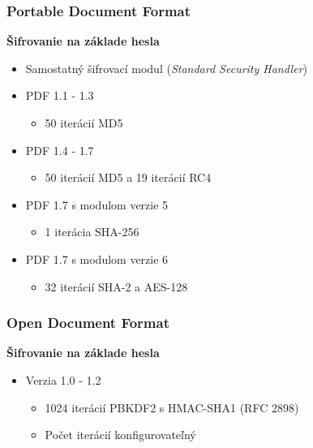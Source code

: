\documentclass[xcolor=dvipsnames]{beamer}
\def\itemtitle#1{{\bfseries#1\smallskip}}
\begin{document}
\begin{frame}
	\frametitle{Portable Document Format}
	\itemtitle{Šifrovanie na základe hesla}
	\begin{itemize}
		\item Samostatný šifrovací modul (\textit{Standard Security Handler}) 
		\item PDF 1.1 - 1.3
		\begin{itemize}
			\item 50 iterácií MD5
		\end{itemize}
		\item PDF 1.4 - 1.7
		\begin{itemize}
			\item 50 iterácií MD5 a 19 iterácií RC4
		\end{itemize}
		\item PDF 1.7 s modulom verzie 5
		\begin{itemize}
			\item 1 iterácia SHA-256
		\end{itemize}
		\item PDF 1.7 s modulom verzie 6
		\begin{itemize}
			\item 32 iterácií SHA-2 a AES-128
		\end{itemize}
	\end{itemize}	
\end{frame}


\begin{frame}
	\frametitle{Open Document Format}
	\itemtitle{Šifrovanie na základe hesla}
	\begin{itemize}
		\item Verzia 1.0 - 1.2
		\begin{itemize}
			\item 1024 iterácií PBKDF2 s HMAC-SHA1 (RFC 2898)
			\item Počet iterácií konfigurovateľný
		\end{itemize}
	\end{itemize}
\end{frame}

\end{document}
